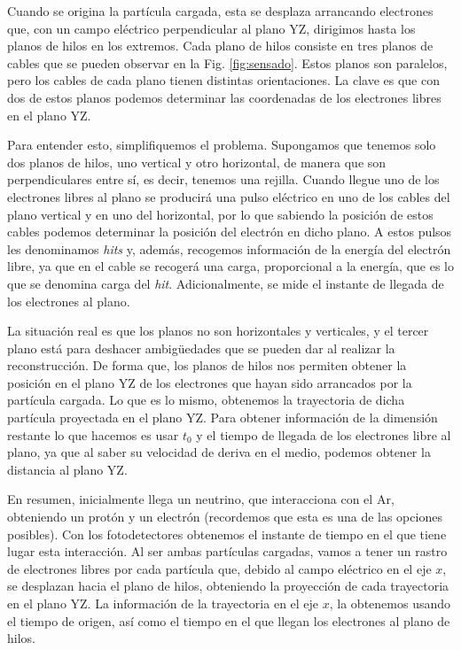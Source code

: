 \documentclass[a4paper,12pt,oneside,titlepage]{book}
\begin{document}
Cuando se origina la partícula cargada, esta se desplaza arrancando electrones que, con un campo eléctrico perpendicular al plano YZ, dirigimos hasta los planos de hilos en los extremos. Cada plano de hilos consiste en tres planos de cables que se pueden observar en la Fig. \ref{fig:sensado}. Estos planos son paralelos, pero los cables de cada plano tienen distintas orientaciones. La clave es que con dos de estos planos podemos determinar las coordenadas de los electrones libres en el plano YZ.

Para entender esto, simplifiquemos el problema. Supongamos que tenemos solo dos planos de hilos, uno vertical y otro horizontal, de manera que son perpendiculares entre sí, es decir, tenemos una rejilla. Cuando llegue uno de los electrones libres al plano se producirá una pulso eléctrico en uno de los cables del plano vertical y en uno del horizontal, por lo que sabiendo la posición de estos cables podemos determinar la posición del electrón en dicho plano. A estos pulsos les denominamos \textit{hits} y, además, recogemos información de la energía del electrón libre, ya que en el cable se recogerá una carga, proporcional a la energía, que es lo que se denomina carga del \textit{hit}. Adicionalmente, se mide el instante de llegada de los electrones al plano.

La situación real es que los planos no son horizontales y verticales, y el tercer plano está para deshacer ambigüedades que se pueden dar al realizar la reconstrucción. De forma que, los planos de hilos nos permiten obtener la posición en el plano YZ de los electrones que hayan sido arrancados por la partícula cargada. Lo que es lo mismo, obtenemos la trayectoria de dicha partícula proyectada en el plano YZ. Para obtener información de la dimensión restante lo que hacemos es usar $t_0$ y el tiempo de llegada de los electrones libre al plano, ya que al saber su velocidad de deriva en el medio, podemos obtener la distancia al plano YZ.

En resumen, inicialmente llega un neutrino, que interacciona con el Ar, obteniendo un protón y un electrón (recordemos que esta es una de las opciones posibles). Con los fotodetectores obtenemos el instante de tiempo en el que tiene lugar esta interacción. Al ser ambas partículas cargadas, vamos a tener un rastro de electrones libres por cada partícula que, debido al campo eléctrico en el eje $x$, se desplazan hacia el plano de hilos, obteniendo la proyección de cada trayectoria en el plano YZ. La información de la trayectoria en el eje $x$, la obtenemos usando el tiempo de origen, así como el tiempo en el que llegan los electrones al plano de hilos.
\end{document}
